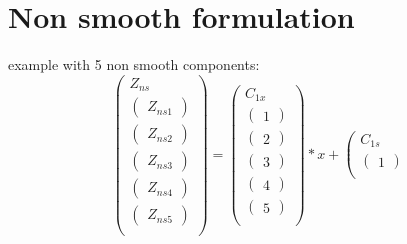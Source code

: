 \documentclass[10pt]{article}
\begin{document}
\section{Non smooth formulation}
example with 5 non smooth components:\\


\[\left(\begin{array}{c}
  Z_{ns}\\
  \hline
  \left(\begin{array}{c} Z_{ns1} \end{array}\right)\\
  \left(\begin{array}{c} Z_{ns2} \end{array}\right)\\
  \left(\begin{array}{c} Z_{ns3} \end{array}\right)\\
  \left(\begin{array}{c} Z_{ns4} \end{array}\right)\\
  \left(\begin{array}{c} Z_{ns5} \end{array}\right)\\
\end{array}\right) =
\left(\begin{array}{c}
  C_{1x}\\
  \hline
  \left(\begin{array}{c}1\end{array}\right)\\
  \left(\begin{array}{c}2\end{array}\right)\\
  \left(\begin{array}{c}3\end{array}\right)\\
  \left(\begin{array}{c}4\end{array}\right)\\
  \left(\begin{array}{c}5\end{array}\right)\\
\end{array}\right)*x +
\left(\begin{array}{c}
  C_{1s}\\
  \hline
  \left(\begin{array}{c}1\end{array}\right)\\

\end{array}\]
\end{document}
